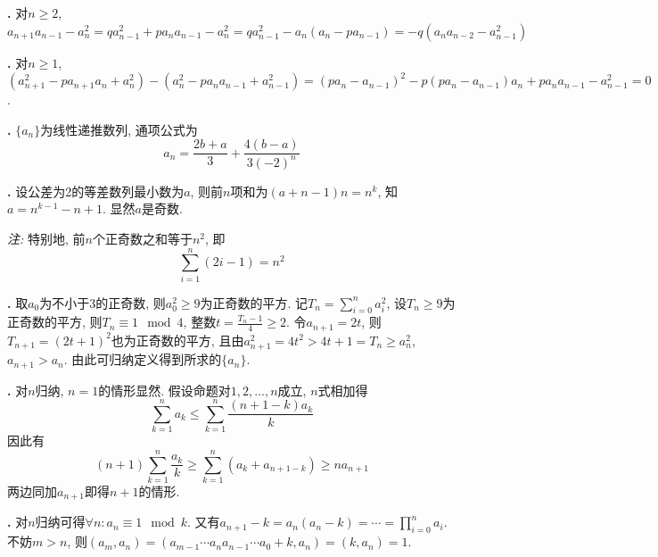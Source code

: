 \par \textbf{\thesolseq .} 对$n\ge 2$, $a_{n+1}a_{n-1}-a_n^2=qa_{n-1}^2 + pa_na_{n-1}-a_n^2=qa_{n-1}^2 - a_n(a_n-pa_{n-1})=-q(a_na_{n-2}-a_{n-1}^2)$

\par \textbf{\thesolseq .} 对$n\ge 1$, $(a_{n+1}^2-pa_{n+1}a_n+a_n^2)-(a_{n}^2-pa_na_{n-1}+a_{n-1}^2)=(pa_n-a_{n-1})^2-p(pa_n-a_{n-1})a_n+pa_na_{n-1}-a_{n-1}^2=0$.

\par \textbf{\thesolseq .} $\{a_n\}$为线性递推数列, 通项公式为
\begin{equation}
    a_n=\frac{2b+a}{3}+\frac{4(b-a)}{3(-2)^n}
\end{equation} 


\par \textbf{\thesolseq .} 设公差为2的等差数列最小数为$a$, 则前$n$项和为$(a+n-1)n=n^k$, 知$a=n^{k-1}-n+1$. 显然$a$是奇数. 
\par \emph{注:} 特别地, 前$n$个正奇数之和等于$n^2$, 即
\begin{equation}
    \sum_{i=1}^n (2i-1) = n^2
\end{equation}

\par \textbf{\thesolseq .} 取$a_0$为不小于3的正奇数, 则$a_0^2\ge 9$为正奇数的平方. 记$T_n=\sum_{i=0}^n a_i^2$, 设$T_n\ge 9$为正奇数的平方, 则$T_n\equiv 1 \mod 4$, 整数$t=\frac{T_n-1}{4}\ge 2$. 令$a_{n+1}=2t$, 则$T_{n+1}=(2t+1)^2$也为正奇数的平方, 且由$a_{n+1}^2=4t^2>4t+1=T_{n}\ge a_n^2$, $a_{n+1}>a_{n}$. 由此可归纳定义得到所求的$\{a_n\}$. 

\par \textbf{\thesolseq .} \cite{SMI} 对$n$归纳, $n=1$的情形显然. 假设命题对$1,2,\dots,n$成立, $n$式相加得
\begin{equation}
    \sum_{k=1}^n a_k\le \sum_{k=1}^n \frac{(n+1-k)a_k}{k}
\end{equation}
因此有
\begin{equation}
    (n+1)\sum_{k=1}^n \frac{a_k}{k}\ge \sum_{k=1}^n (a_k+a_{n+1-k})\ge na_{n+1}
\end{equation}
两边同加$a_{n+1}$即得$n+1$的情形. 

\par \textbf{\thesolseq .} \cite{SMI} 对$n$归纳可得$\forall n: a_n \equiv 1 \mod k$. 又有$a_{n+1} - k = a_n(a_n-k)=\cdots=\prod_{i=0}^n a_i$. 不妨$m>n$, 则$(a_m,a_n)=(a_{m-1}\cdots a_n a_{n-1}\cdots a_0+k, a_n)=(k, a_n)=1$. 